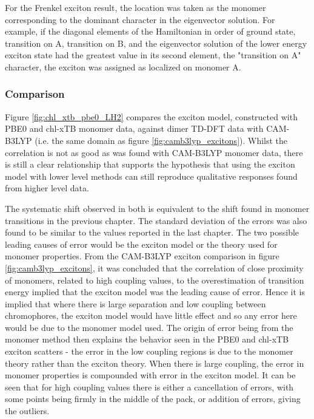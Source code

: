 For the Frenkel exciton result, the location was taken as the monomer corresponding
to the dominant character in the eigenvector solution. For example, if the diagonal
elements of the Hamiltonian in order of ground state, transition on A, transition
on B, and the eigenvector solution of the lower energy exciton state had the greatest
value in its second element, the "transition on A" character, the exciton was assigned
as localized on monomer A.

\subsubsection{Comparison}
\label{subsec:state_assign}

Figure \ref{fig:chl_xtb_pbe0_LH2} compares the exciton model, constructed with PBE0
and chl-xTB monomer data, against dimer TD-DFT data with CAM-B3LYP (i.e. the same
domain as figure \ref{fig:camb3lyp_excitons}). Whilst the correlation is not as good
as was found with CAM-B3LYP monomer data, there is still a clear relationship that
supports the hypothesis that using the exciton model with lower level methods can
still reproduce qualitative responses found from higher level data.

The systematic shift observed in both is equivalent to the shift found in monomer
transitions in the previous chapter. The standard deviation of the errors was also
found to be similar to the values reported in the last chapter.
The two possible leading causes of error would be the exciton model or the theory 
used for monomer properties. From the CAM-B3LYP exciton comparison in figure \ref{fig:camb3lyp_excitons},
it was concluded that the correlation of close proximity of monomers, related to 
high coupling values, to the overestimation of transition energy implied that the 
exciton model was the leading cause of error. Hence it is implied that where there
is large separation and low coupling between chromophores, the exciton model would 
have little effect and so any error here would be due to the monomer model used. 
The origin of error being from the monomer method then explains the behavior seen
in the PBE0 and chl-xTB exciton scatters - the error in the low coupling regions
is due to the monomer theory rather than the exciton theory. When there is large
coupling, the error in monomer properties is compounded with error in the exciton
model. It can be seen that for high coupling values there is either a cancellation
of errors, with some points being firmly in the middle of the pack, or addition 
of errors, giving the outliers.

